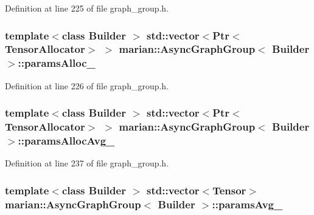 Definition at line 225 of file graph\+\_\+group.\+h.

\subsubsection[{\texorpdfstring{params\+Alloc\+\_\+}{paramsAlloc_}}]{\setlength{\rightskip}{0pt plus 5cm}template$<$class Builder $>$ std\+::vector$<${\bf Ptr}$<${\bf Tensor\+Allocator}$>$ $>$ {\bf marian\+::\+Async\+Graph\+Group}$<$ Builder $>$\+::params\+Alloc\+\_\+\hspace{0.3cm}{\ttfamily [private]}}\hypertarget{classmarian_1_1AsyncGraphGroup_ab881a69415a65b21d9741b6afa2d9f6f}{}\label{classmarian_1_1AsyncGraphGroup_ab881a69415a65b21d9741b6afa2d9f6f}


Definition at line 226 of file graph\+\_\+group.\+h.

\subsubsection[{\texorpdfstring{params\+Alloc\+Avg\+\_\+}{paramsAllocAvg_}}]{\setlength{\rightskip}{0pt plus 5cm}template$<$class Builder $>$ std\+::vector$<${\bf Ptr}$<${\bf Tensor\+Allocator}$>$ $>$ {\bf marian\+::\+Async\+Graph\+Group}$<$ Builder $>$\+::params\+Alloc\+Avg\+\_\+\hspace{0.3cm}{\ttfamily [private]}}\hypertarget{classmarian_1_1AsyncGraphGroup_af6fd0e5be552825e8190fcb17fe63671}{}\label{classmarian_1_1AsyncGraphGroup_af6fd0e5be552825e8190fcb17fe63671}


Definition at line 237 of file graph\+\_\+group.\+h.

\subsubsection[{\texorpdfstring{params\+Avg\+\_\+}{paramsAvg_}}]{\setlength{\rightskip}{0pt plus 5cm}template$<$class Builder $>$ std\+::vector$<${\bf Tensor}$>$ {\bf marian\+::\+Async\+Graph\+Group}$<$ Builder $>$\+::params\+Avg\+\_\+\hspace{0.3cm}{\ttfamily [private]}}\hypertarget{classmarian_1_1AsyncGraphGroup_a203413621a666e7e5c9394a3a02498f4}{}\label{classmarian_1_1AsyncGraphGroup_a203413621a666e7e5c9394a3a02498f4}



